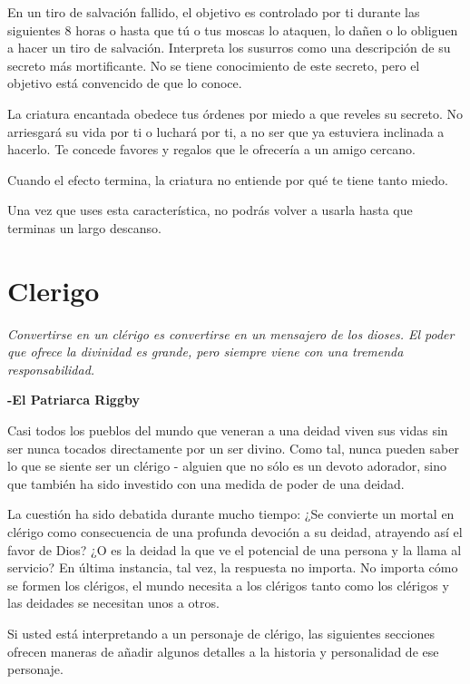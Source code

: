 \documentclass[a4paper,twocolumn,openany,10pt]{dndbook}
\begin{document}
En un tiro de salvación fallido, el objetivo es controlado por ti durante las siguientes 8 horas o hasta que tú o tus moscas lo
ataquen, lo dañen o lo obliguen a hacer un tiro de salvación. Interpreta los susurros como una descripción de su secreto más
mortificante. No se tiene conocimiento de este secreto, pero el objetivo está convencido de que lo conoce.

La criatura encantada obedece tus órdenes por miedo a que reveles su secreto. No arriesgará su vida por ti o luchará por ti, a
no ser que ya estuviera inclinada a hacerlo. Te concede favores y regalos que le ofrecería a un amigo cercano.

Cuando el efecto termina, la criatura no entiende por qué te tiene tanto miedo.

Una vez que uses esta característica, no podrás volver a usarla hasta que terminas un largo descanso.  

\section{Clerigo}

\begin{quotebox}
	\textit{Convertirse en un clérigo es convertirse en un mensajero de los dioses. El poder que ofrece la divinidad es grande,
	pero siempre viene con una tremenda responsabilidad.}

	\begin{flushright}
	\textbf{-El Patriarca Riggby}
	\end{flushright}
\end{quotebox}

Casi todos los pueblos del mundo que veneran a una deidad viven sus vidas sin ser nunca tocados directamente por un ser divino.
Como tal, nunca pueden saber lo que se siente ser un clérigo - alguien que no sólo es un devoto adorador, sino que también ha
sido investido con una medida de poder de una deidad.

La cuestión ha sido debatida durante mucho tiempo: ¿Se convierte un mortal en clérigo como consecuencia de una profunda
devoción a su deidad, atrayendo así el favor de Dios? ¿O es la deidad la que ve el potencial de una persona y la llama al
servicio? En última instancia, tal vez, la respuesta no importa. No importa cómo se formen los clérigos, el mundo necesita a
los clérigos tanto como los clérigos y las deidades se necesitan unos a otros.

Si usted está interpretando a un personaje de clérigo, las siguientes secciones ofrecen maneras de añadir algunos detalles a la 
historia y personalidad de ese personaje. 
\end{document}
